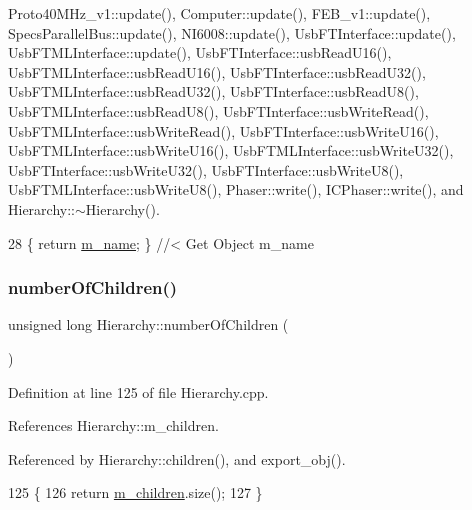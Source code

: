 Proto40\+M\+Hz\+\_\+v1\+::update(), Computer\+::update(), F\+E\+B\+\_\+v1\+::update(), Specs\+Parallel\+Bus\+::update(), N\+I6008\+::update(), Usb\+F\+T\+Interface\+::update(), Usb\+F\+T\+M\+L\+Interface\+::update(), Usb\+F\+T\+Interface\+::usb\+Read\+U16(), Usb\+F\+T\+M\+L\+Interface\+::usb\+Read\+U16(), Usb\+F\+T\+Interface\+::usb\+Read\+U32(), Usb\+F\+T\+M\+L\+Interface\+::usb\+Read\+U32(), Usb\+F\+T\+Interface\+::usb\+Read\+U8(), Usb\+F\+T\+M\+L\+Interface\+::usb\+Read\+U8(), Usb\+F\+T\+Interface\+::usb\+Write\+Read(), Usb\+F\+T\+M\+L\+Interface\+::usb\+Write\+Read(), Usb\+F\+T\+Interface\+::usb\+Write\+U16(), Usb\+F\+T\+M\+L\+Interface\+::usb\+Write\+U16(), Usb\+F\+T\+M\+L\+Interface\+::usb\+Write\+U32(), Usb\+F\+T\+Interface\+::usb\+Write\+U32(), Usb\+F\+T\+Interface\+::usb\+Write\+U8(), Usb\+F\+T\+M\+L\+Interface\+::usb\+Write\+U8(), Phaser\+::write(), I\+C\+Phaser\+::write(), and Hierarchy\+::$\sim$\+Hierarchy().


\begin{DoxyCode}
28 \{ \textcolor{keywordflow}{return} \hyperlink{classObject_a8b83c95c705d2c3ba0d081fe1710f48d}{m\_name}; \} \textcolor{comment}{//< Get Object m\_name}
\end{DoxyCode}
\mbox{\label{classHierarchy_ab16e84de65fd84e14001a6cf941c8be4}} 
\subsubsection{\texorpdfstring{number\+Of\+Children()}{numberOfChildren()}}
{\footnotesize\ttfamily unsigned long Hierarchy\+::number\+Of\+Children (\begin{DoxyParamCaption}{ }\end{DoxyParamCaption})\hspace{0.3cm}{\ttfamily [inherited]}}



Definition at line 125 of file Hierarchy.\+cpp.



References Hierarchy\+::m\+\_\+children.



Referenced by Hierarchy\+::children(), and export\+\_\+obj().


\begin{DoxyCode}
125                                            \{
126   \textcolor{keywordflow}{return} \hyperlink{classHierarchy_a038816763941fd4a930504917f60483b}{m\_children}.size();
127 \}
\end{DoxyCode}
\mbox{\label{classHierarchy_aee461dc930ce3871636ff87f075b1b83}} 
